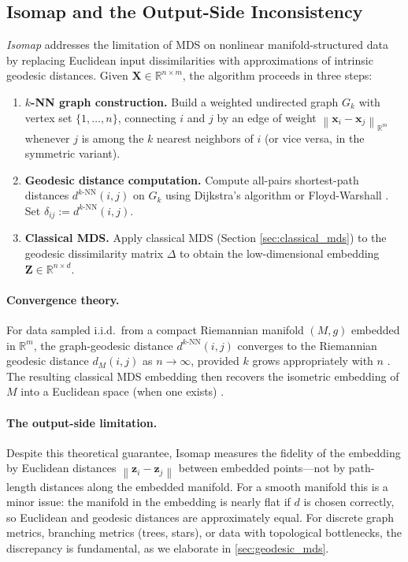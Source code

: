 \documentclass[twoside,11pt]{article}
\newcommand{\R}{\mathbb{R}}
\newcommand{\bx}{\mathbf{x}}
\newcommand{\bX}{\mathbf{X}}
\newcommand{\bz}{\mathbf{z}}
\newcommand{\bZ}{\mathbf{Z}}
\newcommand{\norm}[1]{\left\|#1\right\|}
\newcommand{\dknn}{d^{k\text{-NN}}}
\newcommand{\Gk}{G_k}
\begin{document}
\subsection{Isomap and the Output-Side Inconsistency}
\label{sec:isomap}

\emph{Isomap} \citep{tenenbaum2000global} addresses the limitation of MDS
on nonlinear manifold-structured data by replacing Euclidean input
dissimilarities with approximations of intrinsic geodesic distances.
Given $\bX \in \R^{n \times m}$, the algorithm proceeds in three steps:

\begin{enumerate}
  \item \textbf{$k$-NN graph construction.}  Build a weighted undirected
  graph $\Gk$ with vertex set $\{1, \ldots, n\}$, connecting $i$ and $j$
  by an edge of weight $\norm{\bx_i - \bx_j}_{\R^m}$ whenever $j$ is
  among the $k$ nearest neighbors of $i$ (or vice versa, in the symmetric
  variant).

  \item \textbf{Geodesic distance computation.}  Compute all-pairs
  shortest-path distances $\dknn(i,j)$ on $\Gk$ using Dijkstra's
  algorithm \citep{dijkstra1959note} or Floyd-Warshall
  \citep{floyd1962algorithm}.  Set $\delta_{ij} := \dknn(i,j)$.

  \item \textbf{Classical MDS.}  Apply classical MDS (Section
  \ref{sec:classical_mds}) to the geodesic dissimilarity matrix $\Delta$
  to obtain the low-dimensional embedding $\bZ \in \R^{n \times d}$.
\end{enumerate}

\paragraph{Convergence theory.}
For data sampled i.i.d.\ from a compact Riemannian manifold $(M, g)$
embedded in $\R^m$, the graph-geodesic distance $\dknn(i,j)$ converges
to the Riemannian geodesic distance $d_M(i,j)$ as $n \to \infty$, provided
$k$ grows appropriately with $n$ \citep{bernstein2000graph,
tenenbaum2000global, zha2003continuum, donoho2003hessian}.
The resulting classical MDS embedding then recovers the isometric embedding
of $M$ into a Euclidean space (when one exists) \citep{tenenbaum2000global}.

\paragraph{The output-side limitation.}
Despite this theoretical guarantee, Isomap measures the fidelity of the
embedding by Euclidean distances $\norm{\bz_i - \bz_j}$ between embedded
points---not by path-length distances along the embedded manifold.  For a
smooth manifold this is a minor issue: the manifold in the embedding is
nearly flat if $d$ is chosen correctly, so Euclidean and geodesic distances
are approximately equal.  For discrete graph metrics, branching metrics
(trees, stars), or data with topological bottlenecks, the discrepancy is
fundamental, as we elaborate in \cref{sec:geodesic_mds}.
\end{document}

